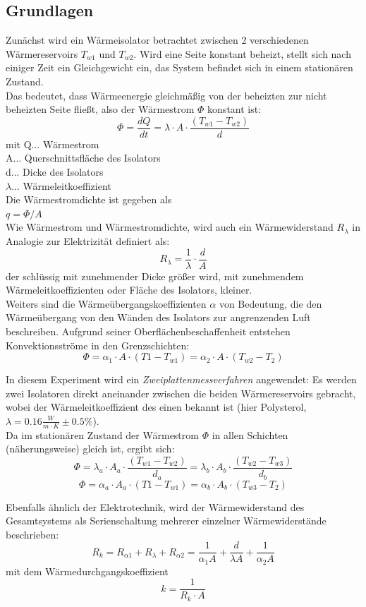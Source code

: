 \documentclass[12pt,a4paper]{article}
\begin{document}
\begin{multicols}{2}
\subsection{Grundlagen}
Zunächst wird ein Wärmeisolator betrachtet zwischen 2 verschiedenen Wärmereservoirs $T_{w1}$ und $T_{w2}$. Wird eine Seite konstant beheizt, stellt sich nach einiger Zeit ein Gleichgewicht ein, das System befindet sich in einem stationären Zustand.\\
Das bedeutet, dass Wärmeenergie gleichmäßig von der beheizten zur nicht beheizten Seite fließt, also der Wärmestrom $\Phi$ konstant ist:
$$\Phi=\frac{dQ}{dt}=\lambda \cdot A \cdot \frac{(T_{w1}-T_{w2})}{d}$$
mit Q... Wärmestrom\\
A... Querschnittsfläche des Isolators\\
d... Dicke des Isolators\\
$\lambda$... Wärmeleitkoeffizient\\
Die Wärmestromdichte ist gegeben als\\
$q=\Phi/A$\\
Wie Wärmestrom und Wärmestromdichte, wird auch ein Wärmewiderstand $R_{\lambda}$ in Analogie zur Elektrizität definiert als:
$$R_{\lambda}=\frac{1}{\lambda}\cdot \frac{d}{A} $$
der schlüssig mit zunehmender Dicke größer wird, mit zunehmendem Wärmeleitkoeffizienten oder Fläche des Isolators, kleiner.\\
Weiters sind die Wärmeübergangskoeffizienten $\alpha$ von Bedeutung, die den Wärmeübergang von den Wänden des Isolators zur angrenzenden Luft beschreiben. Aufgrund seiner Oberflächenbeschaffenheit entstehen Konvektionsströme in den Grenzschichten:
$$\Phi = \alpha_1 \cdot A \cdot (T1-T_{w1}) = \alpha_2 \cdot A \cdot (T_{w2}-T_2) $$

\noindent In diesem Experiment wird ein \emph{Zweiplattenmessverfahren} angewendet: Es werden zwei Isolatoren direkt aneinander zwischen die beiden Wärmereservoirs gebracht, wobei der Wärmeleitkoeffizient des einen bekannt ist (hier Polysterol, $\lambda = 0.16 \frac{W}{m \cdot K}\pm 0.5\%$).\\
Da im stationären Zustand der Wärmestrom $\Phi$ in allen Schichten (näherungsweise) gleich ist, ergibt sich:
$$\Phi=\lambda_a \cdot A_a \cdot \frac{(T_{w1}-T_{w2})}{d_a}=\lambda_b \cdot A_b \cdot \frac{(T_{w2}-T_{w3})}{d_b}$$
$$\Phi = \alpha_a \cdot A_a \cdot (T1-T_{w1}) = \alpha_b \cdot A_b \cdot (T_{w3}-T_2) $$

Ebenfalls ähnlich der Elektrotechnik, wird der Wärmewiderstand des Gesamtsystems als Serienschaltung mehrerer einzelner Wärmewiderstände beschrieben:
$$R_k = R_{\alpha1}+R_{\lambda} + R_{\alpha2}=\frac{1}{\alpha_1 A}+\frac{d}{\lambda A}+\frac{1}{\alpha_2 A}$$
mit dem Wärmedurchgangskoeffizient
$$k = \frac{1}{R_k \cdot A}$$


\end{multicols}
\end{document}
